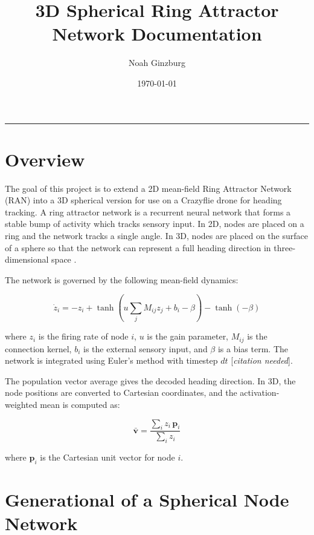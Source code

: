 \documentclass[12pt, letterpaper]{article}
\title{3D Spherical Ring Attractor Network Documentation}
\author{Noah Ginzburg}
\date{\today}
\begin{document}
\maketitle
\rule{0.95\textwidth}{0.5pt}

\tableofcontents
\newpage

\section{Overview}

The goal of this project is to extend a 2D mean-field Ring Attractor Network (RAN) into a 3D spherical version for use on a Crazyflie drone for heading tracking. A ring attractor network is a recurrent neural network that forms a stable bump of activity which tracks sensory input. In 2D, nodes are placed on a ring and the network tracks a single angle. In 3D, nodes are placed on the surface of a sphere so that the network can represent a full heading direction in three-dimensional space \cite{salahshour2025allocentric}.

The network is governed by the following mean-field dynamics:

\begin{equation}
    \dot{z}_i = -z_i + \tanh\left(u \sum_j M_{ij} z_j + b_i - \beta\right) - \tanh(-\beta)
\end{equation}

where $z_i$ is the firing rate of node $i$, $u$ is the gain parameter, $M_{ij}$ is the connection kernel, $b_i$ is the external sensory input, and $\beta$ is a bias term. The network is integrated using Euler's method with timestep $dt$ [\textit{citation needed}].

The population vector average gives the decoded heading direction. In 3D, the node positions are converted to Cartesian coordinates, and the activation-weighted mean is computed as:

\begin{equation}
    \bar{\mathbf{v}} = \frac{\sum_i z_i \, \mathbf{p}_i}{\sum_i z_i}
\end{equation}

where $\mathbf{p}_i$ is the Cartesian unit vector for node $i$.

\section{Generational of a Spherical Node Network}
\end{document}
